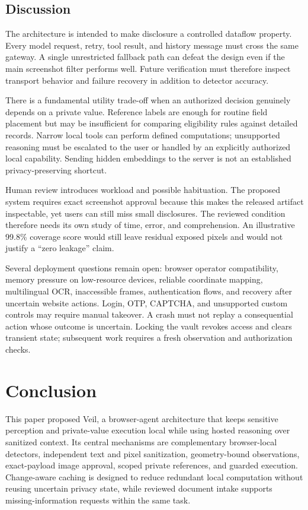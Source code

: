 \documentclass[conference]{IEEEtran}
\newcommand{\sys}{Veil}
\begin{document}
\subsection{Discussion}
The architecture is intended to make disclosure a controlled dataflow property. Every model request, retry, tool result, and history message must cross the same gateway. A single unrestricted fallback path can defeat the design even if the main screenshot filter performs well. Future verification must therefore inspect transport behavior and failure recovery in addition to detector accuracy.

There is a fundamental utility trade-off when an authorized decision genuinely depends on a private value. Reference labels are enough for routine field placement but may be insufficient for comparing eligibility rules against detailed records. Narrow local tools can perform defined computations; unsupported reasoning must be escalated to the user or handled by an explicitly authorized local capability. Sending hidden embeddings to the server is not an established privacy-preserving shortcut.

Human review introduces workload and possible habituation. The proposed system requires exact screenshot approval because this makes the released artifact inspectable, yet users can still miss small disclosures. The reviewed condition therefore needs its own study of time, error, and comprehension. An illustrative 99.8\% coverage score would still leave residual exposed pixels and would not justify a ``zero leakage'' claim.

Several deployment questions remain open: browser operator compatibility, memory pressure on low-resource devices, reliable coordinate mapping, multilingual OCR, inaccessible frames, authentication flows, and recovery after uncertain website actions. Login, OTP, CAPTCHA, and unsupported custom controls may require manual takeover. A crash must not replay a consequential action whose outcome is uncertain. Locking the vault revokes access and clears transient state; subsequent work requires a fresh observation and authorization checks.



\section*{Conclusion}
This paper proposed \sys, a browser-agent architecture that keeps sensitive perception and private-value execution local while using hosted reasoning over sanitized context. Its central mechanisms are complementary browser-local detectors, independent text and pixel sanitization, geometry-bound observations, exact-payload image approval, scoped private references, and guarded execution. Change-aware caching is designed to reduce redundant local computation without reusing uncertain privacy state, while reviewed document intake supports missing-information requests within the same task.
\end{document}
